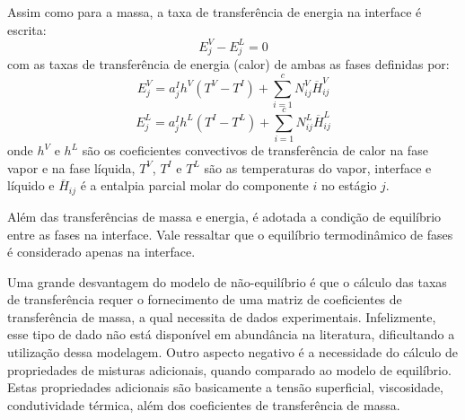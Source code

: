 
Assim como para a massa, a taxa de transferência de energia na interface é escrita:
\begin{equation}
E^V_j -  E^L_j = 0
\label{eq:balancofluxoenergia}
\end{equation}
com as taxas de transferência de energia (calor) de ambas as fases definidas por:
\begin{equation}
E^V_j = a_j^I h^V \left( T^V - T^I\right) + \sum^c_{i=1} N^V_{ij}
\overline{H}^V_{ij}
\label{eq:taxaevj}
\end{equation}
\begin{equation}
E^L_j = a_j^I h^L \left( T^I - T^L\right) + \sum^c_{i=1} N^L_{ij}
\overline{H}^L_{ij}
\label{eq:taxaelj}
\end{equation}
onde $h^V$ e $h^L$ são os coeficientes convectivos de transferência de calor na fase vapor e na fase líquida,
$T^V$, $T^I$ e $T^L$ são as
temperaturas do vapor, interface e líquido e $\overline{H}_{ij}$ é a entalpia parcial molar do componente $i$ no estágio $j$.

Além das transferências de massa e energia, é adotada a condição de equilíbrio entre as fases na interface.
Vale ressaltar que o equilíbrio
termodinâmico de fases é considerado apenas na interface.

Uma grande desvantagem do modelo de não-equilíbrio é que o cálculo das taxas de
transferência requer o fornecimento de uma matriz de coeficientes de
transferência de massa, a qual necessita de dados experimentais. Infelizmente, esse
tipo de dado não está disponível em abundância na literatura, dificultando a utilização dessa modelagem.
Outro aspecto negativo é a necessidade do cálculo de propriedades de
misturas adicionais, quando comparado ao modelo de equilíbrio.
Estas propriedades adicionais são basicamente a tensão superficial,
viscosidade, condutividade térmica, além dos coeficientes de transferência de
massa.

